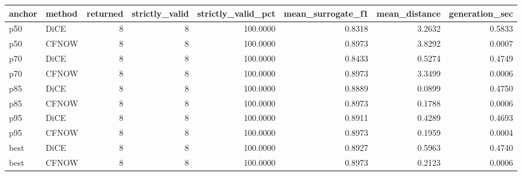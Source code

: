 \begin{tabular}{llrrrrrr}
\toprule
anchor & method &  returned &  strictly\_valid &  strictly\_valid\_pct &  mean\_surrogate\_f1 &  mean\_distance &  generation\_sec \\
\midrule
   p50 &   DiCE &         8 &               8 &            100.0000 &             0.8318 &         3.2632 &          0.5833 \\
   p50 &  CFNOW &         8 &               8 &            100.0000 &             0.8973 &         3.8292 &          0.0007 \\
   p70 &   DiCE &         8 &               8 &            100.0000 &             0.8433 &         0.5274 &          0.4749 \\
   p70 &  CFNOW &         8 &               8 &            100.0000 &             0.8973 &         3.3499 &          0.0006 \\
   p85 &   DiCE &         8 &               8 &            100.0000 &             0.8889 &         0.0899 &          0.4750 \\
   p85 &  CFNOW &         8 &               8 &            100.0000 &             0.8973 &         0.1788 &          0.0006 \\
   p95 &   DiCE &         8 &               8 &            100.0000 &             0.8911 &         0.4289 &          0.4693 \\
   p95 &  CFNOW &         8 &               8 &            100.0000 &             0.8973 &         0.1959 &          0.0004 \\
  best &   DiCE &         8 &               8 &            100.0000 &             0.8927 &         0.5963 &          0.4740 \\
  best &  CFNOW &         8 &               8 &            100.0000 &             0.8973 &         0.2123 &          0.0006 \\
\bottomrule
\end{tabular}
